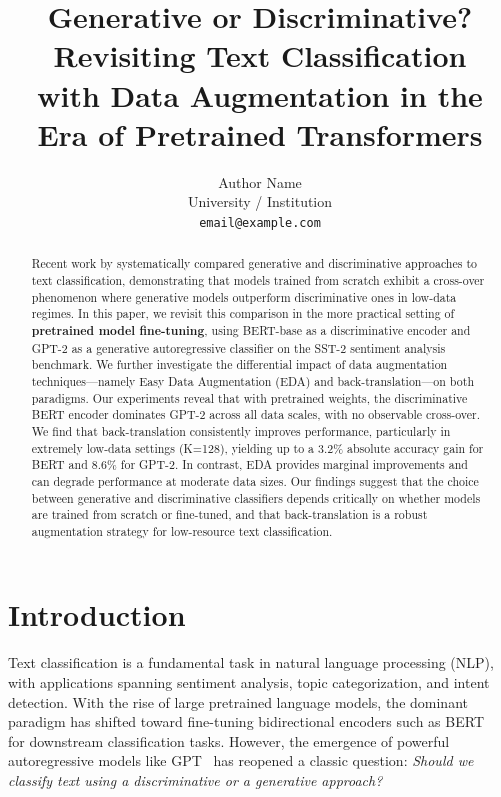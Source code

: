 \documentclass[11pt,a4paper]{article}
\title{Generative or Discriminative? Revisiting Text Classification \\ with Data Augmentation in the Era of Pretrained Transformers}
\author{Author Name \\
  University / Institution \\
  \texttt{email@example.com} \\
}
\date{}
\begin{document}
\maketitle

\begin{abstract}
Recent work by \citet{kasa2025generative} systematically compared generative and discriminative approaches to text classification, demonstrating that models trained from scratch exhibit a cross-over phenomenon where generative models outperform discriminative ones in low-data regimes. In this paper, we revisit this comparison in the more practical setting of \textbf{pretrained model fine-tuning}, using BERT-base as a discriminative encoder and GPT-2 as a generative autoregressive classifier on the SST-2 sentiment analysis benchmark. We further investigate the differential impact of data augmentation techniques---namely Easy Data Augmentation (EDA) and back-translation---on both paradigms. Our experiments reveal that with pretrained weights, the discriminative BERT encoder dominates GPT-2 across all data scales, with no observable cross-over. We find that back-translation consistently improves performance, particularly in extremely low-data settings (K=128), yielding up to a 3.2\% absolute accuracy gain for BERT and 8.6\% for GPT-2. In contrast, EDA provides marginal improvements and can degrade performance at moderate data sizes. Our findings suggest that the choice between generative and discriminative classifiers depends critically on whether models are trained from scratch or fine-tuned, and that back-translation is a robust augmentation strategy for low-resource text classification.
\end{abstract}

\section{Introduction}

Text classification is a fundamental task in natural language processing (NLP), with applications spanning sentiment analysis, topic categorization, and intent detection. With the rise of large pretrained language models, the dominant paradigm has shifted toward fine-tuning bidirectional encoders such as BERT~\cite{devlin2019bert} for downstream classification tasks. However, the emergence of powerful autoregressive models like GPT~\cite{radford2019language} has reopened a classic question: \textit{Should we classify text using a discriminative or a generative approach?}
\end{document}
